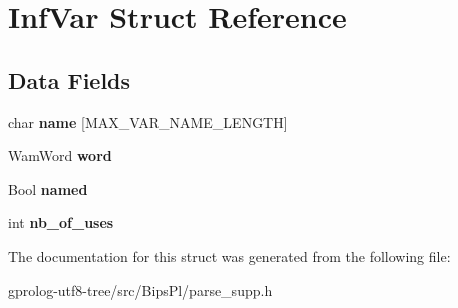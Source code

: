 \hypertarget{structInfVar}{}\section{Inf\+Var Struct Reference}
\label{structInfVar}
\subsection*{Data Fields}
\begin{DoxyCompactItemize}
\item 
char {\bfseries name} \mbox{[}M\+A\+X\+\_\+\+V\+A\+R\+\_\+\+N\+A\+M\+E\+\_\+\+L\+E\+N\+G\+TH\mbox{]}\hypertarget{structInfVar_a0dc32a42fe7338b19884288c0e63b35f}{}\label{structInfVar_a0dc32a42fe7338b19884288c0e63b35f}

\item 
Wam\+Word {\bfseries word}\hypertarget{structInfVar_acc66e228f4cfbb1ab828b0bb95a69621}{}\label{structInfVar_acc66e228f4cfbb1ab828b0bb95a69621}

\item 
Bool {\bfseries named}\hypertarget{structInfVar_a56bb3da1e5f14c34e30d702852740a39}{}\label{structInfVar_a56bb3da1e5f14c34e30d702852740a39}

\item 
int {\bfseries nb\+\_\+of\+\_\+uses}\hypertarget{structInfVar_a38f07afe6ae0ae7f591cf95796469f83}{}\label{structInfVar_a38f07afe6ae0ae7f591cf95796469f83}

\end{DoxyCompactItemize}


The documentation for this struct was generated from the following file\+:\begin{DoxyCompactItemize}
\item 
gprolog-\/utf8-\/tree/src/\+Bips\+Pl/parse\+\_\+supp.\+h\end{DoxyCompactItemize}
